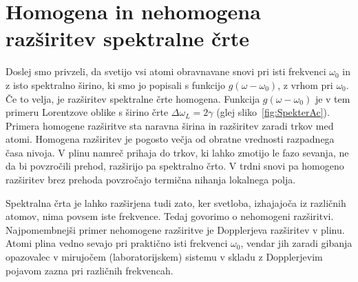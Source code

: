 \section{Homogena in nehomogena razširitev spektralne črte}
\label{Razsiritev}
Doslej smo privzeli, da svetijo vsi atomi obravnavane snovi
pri isti frekvenci $\omega_{0}$ in z isto spektralno širino, ki smo
jo popisali s funkcijo $g(\omega-\omega_0)$, z vrhom pri $\omega_0$. Če to velja, 
je razširitev spektralne črte homogena. 
Funkcija $g(\omega-\omega_0)$ je v tem primeru Lorentzove oblike 
s širino črte $\Delta \omega_L = 2\gamma$ (glej sliko~\ref{fig:SpekterAc}). 
Primera homogene razširitve sta naravna širina in razširitev zaradi trkov med atomi.
Homogena razširitev je pogosto večja od obratne vrednosti razpadnega časa nivoja. 
V plinu namreč prihaja do trkov, ki lahko zmotijo le fazo sevanja, ne da bi povzročili 
prehod, razširijo pa spektralno črto. V trdni snovi pa homogeno razširitev 
brez prehoda povzročajo termična nihanja lokalnega polja. 

Spektralna črta je lahko razširjena tudi zato, ker svetloba, izhajajoča iz različnih
atomov, nima povsem iste frekvence. Tedaj govorimo o nehomogeni 
razširitvi.
Najpomembnejši primer nehomogene razširitve je Dopplerjeva 
 razširitev v plinu. 
Atomi plina vedno sevajo pri praktično isti frekvenci $\omega_0$, vendar jih zaradi gibanja
opazovalec v mirujočem (laboratorijskem) sistemu v skladu z Dopplerjevim pojavom 
zazna pri različnih frekvencah. 

